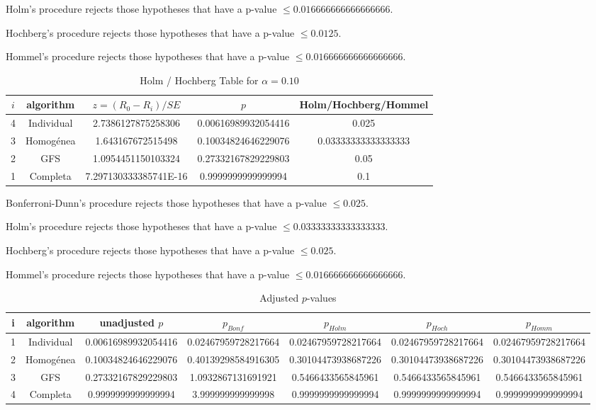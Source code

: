 \documentclass[a4paper,10pt]{article}
\begin{document}
\begin{landscape}
Holm's procedure rejects those hypotheses that have a p-value $\le0.016666666666666666$.


Hochberg's procedure rejects those hypotheses that have a p-value $\le0.0125$.


Hommel's procedure rejects those hypotheses that have a p-value $\le0.016666666666666666$.


\begin{table}[!htp]
\centering\tiny
\caption{Holm / Hochberg Table for $\alpha=0.10$}
\begin{tabular}{ccccc}
$i$&algorithm&$z=(R_0 - R_i)/SE$&$p$&Holm/Hochberg/Hommel\\
\hline
4&Individual&2.7386127875258306&0.00616989932054416&0.025\\
3&Homogénea&1.643167672515498&0.10034824646229076&0.03333333333333333\\
2&GFS&1.0954451150103324&0.27332167829229803&0.05\\
1&Completa&7.297130333385741E-16&0.9999999999999994&0.1\\
\hline
\end{tabular}
\end{table}
Bonferroni-Dunn's procedure rejects those hypotheses that have a p-value $\le0.025$.


Holm's procedure rejects those hypotheses that have a p-value $\le0.03333333333333333$.


Hochberg's procedure rejects those hypotheses that have a p-value $\le0.025$.


Hommel's procedure rejects those hypotheses that have a p-value $\le0.016666666666666666$.


\begin{table}[!htp]
\centering\tiny
\caption{Adjusted $p$-values}
\begin{tabular}{ccccccc}
i&algorithm&unadjusted $p$&$p_{Bonf}$&$p_{Holm}$&$p_{Hoch}$&$p_{Homm}$\\
\hline
1&Individual&0.00616989932054416&0.02467959728217664&0.02467959728217664&0.02467959728217664&0.02467959728217664\\
2&Homogénea&0.10034824646229076&0.40139298584916305&0.30104473938687226&0.30104473938687226&0.30104473938687226\\
3&GFS&0.27332167829229803&1.0932867131691921&0.5466433565845961&0.5466433565845961&0.5466433565845961\\
4&Completa&0.9999999999999994&3.999999999999998&0.9999999999999994&0.9999999999999994&0.9999999999999994\\
\hline
\end{tabular}
\end{table}


\end{landscape}
\end{document}
